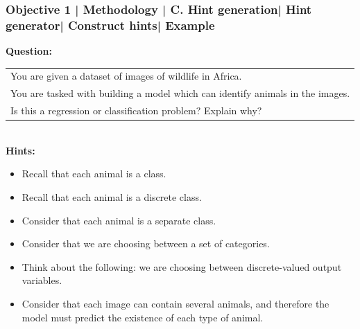 \documentclass{beamer}
\begin{document}
\begin{frame}
\frametitle{Objective 1 | Methodology | C. Hint generation| Hint generator| Construct hints| Example}


{\tiny \textbf{Question:\\}
\colorbox{green!30}{\begin{tabular}[c]{@{}l@{}}You are given a dataset of images of wildlife in Africa.\\ You are tasked with building a model which can identify animals in the images. \\
Is this a regression or classification problem? Explain why?\end{tabular}    }}\\
{\tiny \textbf{Hints:}}
{\tiny \begin{itemize}
	\item Recall that each animal is a class.
	\item Recall that each animal is a discrete class.
	\item Consider that each animal is a separate class.
	\item Consider that we are choosing between a set of categories.
	\item Think about the following: we are choosing between discrete-valued output variables.
	\item Consider that each image can contain several animals, and therefore the model must predict the existence of each type of animal.
	
\end{itemize}}
\end{frame}
\end{document}
